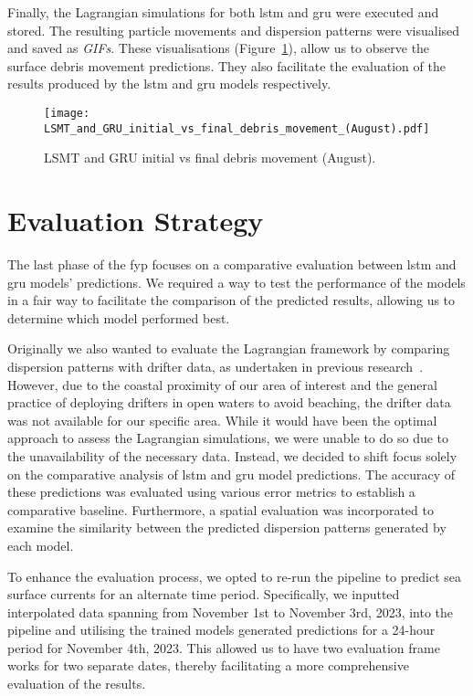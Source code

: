 Finally, the Lagrangian simulations for both \acrshort{lstm} and \acrshort{gru} were executed and stored. The resulting particle movements and dispersion patterns were visualised and saved as \textit{GIFs}. These visualisations (Figure~\ref{fig_3.9}), allow us to observe the surface debris movement predictions. They also facilitate the evaluation of the results produced by the \acrshort{lstm} and \acrshort{gru} models respectively. 

\begin{figure}[htbp]
    \centering
    \texttt{[image: LSMT\_and\_GRU\_initial\_vs\_final\_debris\_movement\_(August).pdf]}
    \caption[Short sample caption.]{LSMT and GRU initial vs final debris movement (August).\label{fig_3.9}}
\end{figure}

\section{Evaluation Strategy}
\label{sec:3.5}

The last phase of the \acrshort{fyp} focuses on a comparative evaluation between \acrshort{lstm} and \acrshort{gru} models' predictions. We required a way to test the performance of the models in a fair way to facilitate the comparison of the predicted results, allowing us to determine which model performed best.

Originally we also wanted to evaluate the Lagrangian framework by comparing dispersion patterns with drifter data, as undertaken in previous research~\cite{34,38}. However, due to the coastal proximity of our area of interest and the general practice of deploying drifters in open waters to avoid beaching, the drifter data was not available for our specific area. While it would have been the optimal approach to assess the Lagrangian simulations, we were unable to do so due to the unavailability of the necessary data. Instead, we decided to shift focus solely on the comparative analysis of \acrshort{lstm} and \acrshort{gru} model predictions. The accuracy of these predictions was evaluated using various error metrics to establish a comparative baseline. Furthermore, a spatial evaluation was incorporated to examine the similarity between the predicted dispersion patterns generated by each model.

To enhance the evaluation process, we opted to re-run the pipeline to predict sea surface currents for an alternate time period. Specifically, we inputted interpolated data spanning from November 1st to November 3rd, 2023, into the pipeline and utilising the trained models generated predictions for a 24-hour period for November 4th, 2023. This allowed us to have two evaluation frame works for two separate dates, thereby facilitating a more comprehensive evaluation of the results. 

